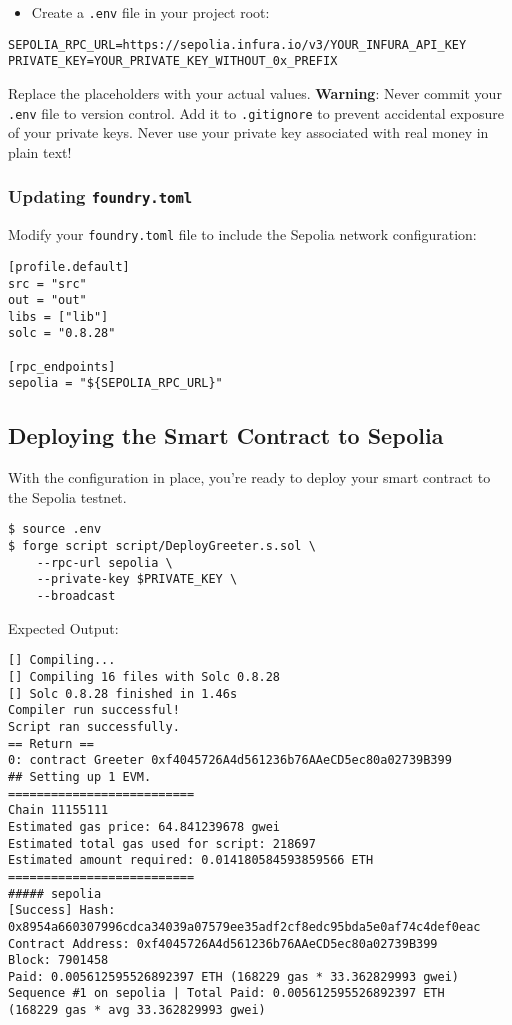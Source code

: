 \documentclass[12pt]{article}
\begin{document}
\begin{itemize}
    \item Create a \texttt{.env} file in your project root:
\end{itemize}

\begin{verbatim}
SEPOLIA_RPC_URL=https://sepolia.infura.io/v3/YOUR_INFURA_API_KEY
PRIVATE_KEY=YOUR_PRIVATE_KEY_WITHOUT_0x_PREFIX
\end{verbatim}

\medskip
\noindent
Replace the placeholders with your actual values. \textbf{Warning}: Never commit your \texttt{.env} file to version control. Add it to \texttt{.gitignore} to prevent accidental exposure of your private keys. Never use your private key associated with real money in plain text!

\subsubsection*{Updating \texttt{foundry.toml}}

Modify your \texttt{foundry.toml} file to include the Sepolia network configuration:

\begin{verbatim}
[profile.default]
src = "src"
out = "out"
libs = ["lib"]
solc = "0.8.28"

[rpc_endpoints]
sepolia = "${SEPOLIA_RPC_URL}"
\end{verbatim}

\subsection{Deploying the Smart Contract to Sepolia}

With the configuration in place, you're ready to deploy your smart contract to the Sepolia testnet.

\begin{verbatim}
$ source .env
$ forge script script/DeployGreeter.s.sol \
    --rpc-url sepolia \
    --private-key $PRIVATE_KEY \
    --broadcast
\end{verbatim}

\noindent
Expected Output:
\begin{verbatim}
[] Compiling...
[] Compiling 16 files with Solc 0.8.28
[] Solc 0.8.28 finished in 1.46s
Compiler run successful!
Script ran successfully.
== Return ==
0: contract Greeter 0xf4045726A4d561236b76AAeCD5ec80a02739B399
## Setting up 1 EVM.
==========================
Chain 11155111
Estimated gas price: 64.841239678 gwei
Estimated total gas used for script: 218697
Estimated amount required: 0.014180584593859566 ETH
==========================
##### sepolia
[Success] Hash: 0x8954a660307996cdca34039a07579ee35adf2cf8edc95bda5e0af74c4def0eac
Contract Address: 0xf4045726A4d561236b76AAeCD5ec80a02739B399
Block: 7901458
Paid: 0.005612595526892397 ETH (168229 gas * 33.362829993 gwei)
Sequence #1 on sepolia | Total Paid: 0.005612595526892397 ETH 
(168229 gas * avg 33.362829993 gwei)
\end{verbatim}
\end{document}
